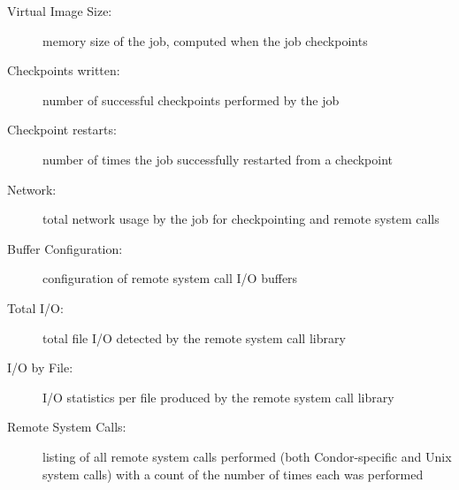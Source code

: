 \begin{description}
\item[Virtual Image Size:] memory size of the job, computed when the
job checkpoints

\item[Checkpoints written:] number of successful checkpoints performed
by the job

\item[Checkpoint restarts:] number of times the job successfully
restarted from a checkpoint

\item[Network:] total network usage by the job for checkpointing and
remote system calls

\item[Buffer Configuration:] configuration of remote system call I/O
buffers

\item[Total I/O:] total file I/O detected by the remote system call
library

\item[I/O by File:] I/O statistics per file produced by the remote
system call library

\item[Remote System Calls:] listing of all remote system calls
performed (both Condor-specific and Unix system calls) with a count of
the number of times each was performed

\end{description}
